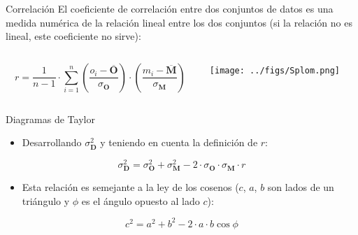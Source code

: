 \documentclass[aspectratio=169, usenames,svgnames,dvipsnames]{beamer}
\begin{document}
\begin{frame}[label={sec:org647e0eb}]{Correlación}
El coeficiente de correlación entre dos conjuntos de datos es una
medida numérica de la relación \alert{lineal} entre los dos conjuntos (si la
relación no es lineal, este coeficiente no sirve):

\begin{columns}
\begin{column}{0.5\columnwidth}
\[
r = \frac{1}{n-1} \cdot \sum_{i=1}^{n} \left( \frac{o_{i}-\overline{\mathbf{O}}}{\sigma_{\mathbf{O}}}\right) \cdot \left(\frac{m_{i}-\overline{\mathbf{M}}}{\sigma_{\mathbf{M}}}\right)
\]
\end{column}

\begin{column}{0.5\columnwidth}
\begin{center}
\texttt{[image: ../figs/Splom.png]}
\end{center}
\end{column}
\end{columns}
\end{frame}


\begin{frame}[label={sec:org11958c8}]{Diagramas de Taylor}
\begin{itemize}
\item Desarrollando \(\sigma^2_{\mathbf{D}}\) y teniendo en cuenta la definición de \(r\):
\end{itemize}

  \[
  \sigma^2_{\mathbf{D}} = \sigma^2_{\mathbf{O}}  + \sigma^2_{\mathbf{M}}
- 2 \cdot \sigma_{\mathbf{O}} \cdot \sigma_{\mathbf{M}} \cdot r
  \]
\begin{itemize}
\item Esta relación es semejante a la ley de los cosenos (\(c\), \(a\), \(b\) son lados de un triángulo y \(\phi\) es el ángulo opuesto al lado \(c\)):
\end{itemize}

\[
c^2 = a^2 + b^2 - 2 \cdot a \cdot b \cos\phi
\]
\nocite{Taylor2000}
\end{frame}
\end{document}
